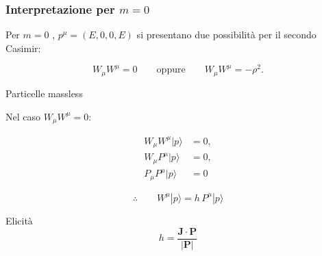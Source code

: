\documentclass[11pt,t,aspectratio=169]{beamer}
\begin{document}
\begin{frame}[c]
    \frametitle{Interpretazione per $m=0$}

    Per $m=0$ ,  $p^\mu=(E,0,0,E)$ si presentano due possibilità per il secondo Casimir:

    \[
        W_\mu W^\mu = 0
        \qquad\text{oppure}\qquad
        W_\mu W^\mu = -\rho^2.
    \]

    \begin{block}{Particelle massless}

        Nel caso $W_\mu W^\mu=0$:

        \[
            \begin{aligned}
                W_\mu W^\mu |p\rangle &= 0,\\[-0.25em]
                W_\mu P^\mu |p\rangle &= 0,\\[-0.25em]
                P_\mu P^\mu |p\rangle &= 0
            \end{aligned}
        \]

        \vspace{-0.35cm}

        \[
            \therefore
            \qquad
            W^\mu |p\rangle
            =
            h\,P^\mu |p\rangle
        \]

    \end{block}

    \begin{exampleblock}{Elicità}
        \[
            h
            =
            \frac{\mathbf{J}\cdot\mathbf{P}}
                 {|\mathbf{P}|}
        \]
    \end{exampleblock}

\end{frame}

\end{document}
